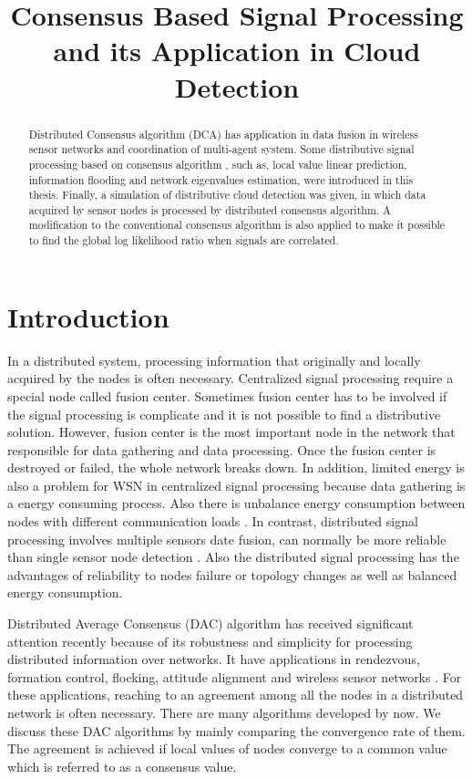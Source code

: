 
\title{Consensus Based Signal Processing and its Application in Cloud Detection}
\maketitle
\begin{abstract}
Distributed Consensus algorithm (DCA) has application in data fusion
in wireless sensor networks and coordination of multi-agent system.
Some distributive signal processing based on consensus algorithm ,
such as, local value linear prediction, information flooding and network
eigenvalues estimation, were introduced in this thesis. Finally, a
simulation of distributive cloud detection was given, in which data
acquired by sensor nodes is processed by distributed consensus algorithm.
A modification to the conventional consensus algorithm is also applied
to make it possible to find the global log likelihood ratio when signals
are correlated.
\end{abstract}

\section{Introduction }

In a distributed system, processing information that originally and
locally acquired by the nodes is often necessary. Centralized signal
processing require a special node called fusion center. Sometimes
fusion center has to be involved if the signal processing is complicate
and it is not possible to find a distributive solution. However, fusion
center is the most important node in the network that responsible
for data gathering and data processing. Once the fusion center is
destroyed or failed, the whole network breaks down. In addition, limited
energy is also a problem for WSN in centralized signal processing
because data gathering is a energy consuming process. Also there is
unbalance energy consumption between nodes with different communication
loads \cite{Cristescu2004}\cite{Yuen2008}. In contrast, distributed
signal processing involves multiple sensors date fusion, can normally
be more reliable than single sensor node detection \cite{Chair1986}\cite{Kam1992}.
Also the distributed signal processing has the advantages of reliability
to nodes failure or topology changes as well as balanced energy consumption.
 

Distributed Average Consensus (DAC) algorithm has received significant
attention recently because of its robustness and simplicity for processing
distributed information over networks. It have applications in rendezvous,
formation control, flocking, attitude alignment and wireless sensor
networks \cite{Ren2007}. For these applications, reaching to an agreement
among all the nodes in a distributed network is often necessary. There
are many algorithms developed by now. We discuss these DAC algorithms
by mainly comparing the convergence rate of them. The agreement is
achieved if local values of nodes converge to a common value which
is referred to as a consensus value. 

